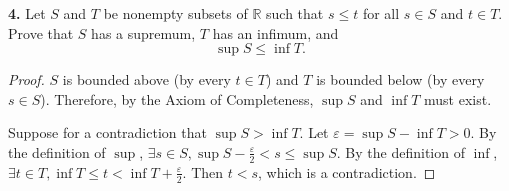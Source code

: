 \documentclass{article}
\newcommand{\R}{\mathbb{R}}
\begin{document}
\newpage %


\textbf{4. }
Let $S$ and $T$ be nonempty subsets of $\R$ such that $s \le t$ for all $s \in S$ and $t \in T$. Prove that $S$ has a supremum, $T$ has an infimum, and
$$\sup S \le \inf T.$$

\begin{proof}
    $S$ is bounded above (by every $t \in T$) and $T$ is bounded below (by every $s \in S$). Therefore, by the Axiom of Completeness, $\sup S$ and $\inf T$ must exist.

    Suppose for a contradiction that $\sup S > \inf T$. Let $\varepsilon = \sup S - \inf T > 0$. By the definition of $\sup$, $\exists s \in S, \sup S - \frac{\varepsilon}{2} < s \le \sup S$. By the definition of $\inf$, $\exists t \in T, \inf T \le t < \inf T + \frac{\varepsilon}{2}$.
    Then $t < s$, which is a contradiction.    
\end{proof}
\end{document}
